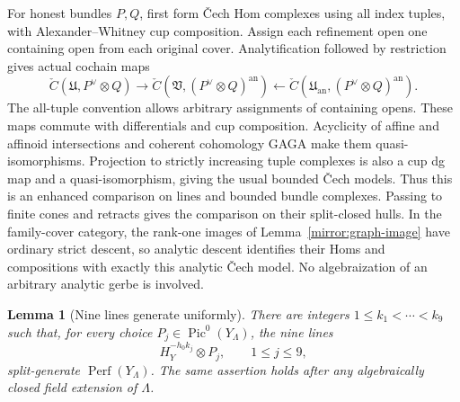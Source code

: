 \documentclass[11pt]{article}
\newtheorem{lemma}[theorem]{Lemma}
\theoremstyle{definition}
\theoremstyle{remark}
\DeclareMathOperator{\Pic}{Pic}
\DeclareMathOperator{\Perf}{Perf}
\numberwithin{equation}{section}
\begin{document}
For honest bundles $P,Q$, first form \v Cech Hom complexes using all
index tuples, with Alexander--Whitney cup composition.  Assign each
refinement open one containing open from each original cover.
Analytification followed by restriction gives actual cochain maps
\[
 \check C(\mathfrak U,P^\vee\otimes Q)
 \longrightarrow
 \check C(\mathfrak V,(P^\vee\otimes Q)^{\mathrm{an}})
 \longleftarrow
 \check C(\mathfrak U_{\mathrm{an}},
                         (P^\vee\otimes Q)^{\mathrm{an}}).
\]
The all-tuple convention allows arbitrary assignments of containing
opens.  These maps commute with differentials and cup composition.
Acyclicity of affine and affinoid intersections and coherent
cohomology GAGA make them quasi-isomorphisms.  Projection to strictly
increasing tuple complexes is also a cup dg map and a
quasi-isomorphism, giving the usual bounded \v Cech models.  Thus
this is an enhanced comparison on lines and bounded bundle
complexes.  Passing to finite cones and retracts gives the comparison
on their split-closed hulls.  In the family-cover category, the
rank-one images of Lemma~\ref{mirror:graph-image} have ordinary strict
descent, so analytic descent identifies their Homs and compositions
with exactly this analytic \v Cech model.  No algebraization of an
arbitrary analytic gerbe is involved.

\begin{lemma}[Nine lines generate uniformly]
\label{mirror:generation}
There are integers $1\leq k_1<\cdots<k_9$ such that, for every
choice $P_j\in\Pic^0(Y_\Lambda)$, the nine lines
\[
 H_Y^{-h_0k_j}\otimes P_j,\qquad 1\leq j\leq9,
\]
split-generate $\Perf(Y_\Lambda)$.  The same assertion holds after
any algebraically closed field extension of $\Lambda$.
\end{lemma}
\end{document}
